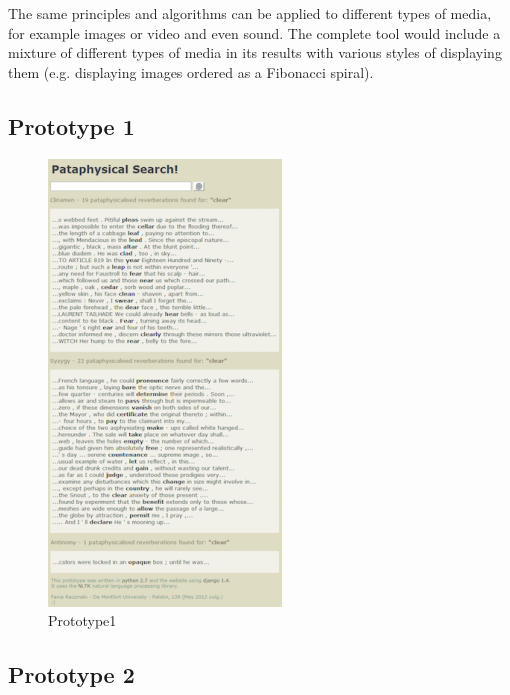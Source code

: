 The same principles and algorithms can be applied to different types of media, for example images or video and even sound. The complete tool would include a mixture of different types of media in its results with various styles of displaying them (e.g. displaying images ordered as a Fibonacci spiral).

\subsection{Prototype 1}

\begin{figure}[htb] %
  \centering
  \includegraphics[height=0.6\textheight]{images/prototype01}
\caption[Prototype1]{Prototype1}
\label{fig:Prototype1}
\end{figure}

\subsection{Prototype 2}

